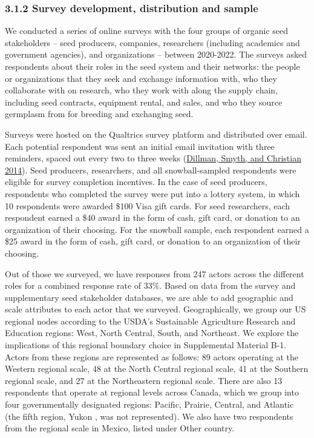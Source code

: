 \documentclass[twoside,12pt,final]{ucthesis-CA2012}
\begin{document}
\begin{ucmainmatter}
\hypertarget{survey-development-distribution-and-sample}{%
\subsubsection{3.1.2 Survey development, distribution and sample}\label{survey-development-distribution-and-sample}}

We conducted a series of online surveys with the four groups of organic
seed stakeholders -- seed producers, companies, researchers (including
academics and government agencies), and organizations -- between
2020-2022. The surveys asked respondents about their roles in the seed
system and their networks: the people or organizations that they seek
and exchange information with, who they collaborate with on research,
who they work with along the supply chain, including seed contracts,
equipment rental, and sales, and who they source germplasm from for
breeding and exchanging seed.

Surveys were hosted on the Qualtrics survey platform and distributed
over email. Each potential respondent was sent an initial email
invitation with three reminders, spaced out every two to three weeks
(\protect\hyperlink{ref-Dillman_Smyth_Christian_2014}{Dillman, Smyth, and Christian 2014}).
Seed producers, researchers, and all snowball-sampled respondents were
eligible for survey completion incentives. In the case of seed
producers, respondents who completed the survey were put into a lottery
system, in which 10 respondents were awarded \$100 Visa gift cards. For
seed researchers, each respondent earned a \$40 award in the form of
cash, gift card, or donation to an organization of their choosing. For
the snowball sample, each respondent earned a \$25 award in the form of
cash, gift card, or donation to an organization of their choosing.

Out of those we surveyed, we have responses from 247 actors across the
different roles for a combined response rate of 33\%. Based on data from
the survey and supplementary seed stakeholder databases, we are able to
add geographic and scale attributes to each actor that we surveyed.
Geographically, we group our US regional nodes according to the USDA's
Sustainable Agriculture Research and Education regions: West, North
Central, South, and Northeast. We explore the implications of this
regional boundary choice in Supplemental Material B-1. Actors from these
regions are represented as follows: 89 actors operating at the Western
regional scale, 48 at the North Central regional scale, 41 at the
Southern regional scale, and 27 at the Northeastern regional scale.
There are also 13 respondents that operate at regional levels across
Canada, which we group into four governmentally designated regions:
Pacific, Prairie, Central, and Atlantic (the fifth region, Yukon , was
not represented). We also have two respondents from the regional scale
in Mexico, listed under \textquotesingle Other country\textquotesingle.


\end{ucmainmatter}
\end{document}
